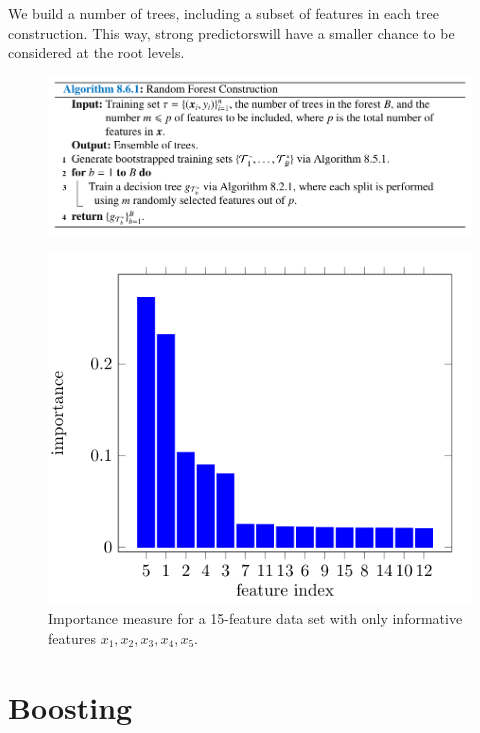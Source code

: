 \documentclass{beamer}
\begin{document}
\begin{frame}
    We build a number of trees, including a subset of features in each tree construction. This way, strong predictorswill have a smaller chance to be considered at the root levels.
    \begin{figure}
        \includegraphics[width=0.9\linewidth]{A861Kroese}
    \end{figure}
\end{frame}

\begin{frame}
    \begin{figure}
        \includegraphics[width=0.7\linewidth]{F89Kroese}
        \caption{Importance measure for a 15-feature data set with only informative features $x_1,x_2,x_3,x_4,x_5$\cite{kroese2020}.}
    \end{figure}
\end{frame}

\section{Boosting}
\end{document}
